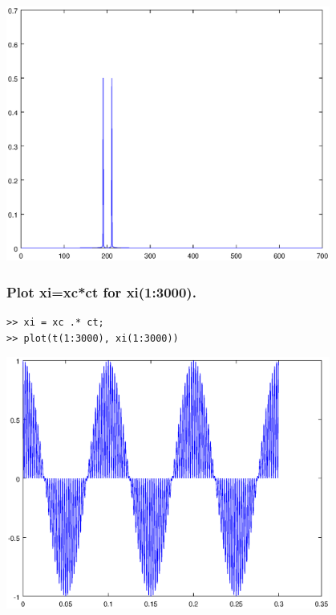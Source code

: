 \documentclass[12pt,a4paper]{article}
\begin{document}
\includegraphics[width=0.8\textwidth]{2d.eps}

\subsubsection{Plot xi=xc*ct for xi(1:3000).}
\begin{lstlisting}
>> xi = xc .* ct;
>> plot(t(1:3000), xi(1:3000))
\end{lstlisting}

\includegraphics[width=0.8\textwidth]{2e.eps}
 
\end{document}
